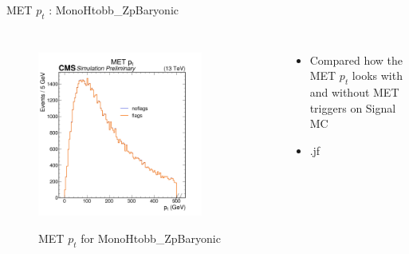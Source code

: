 \documentclass[10pt,xcolor=dvipsnames,aspectratio=169]{beamer}
\begin{document}
  \begin{frame}[fragile]{MET $p_t$ : MonoHtobb\_ZpBaryonic} 
    \begin{columns}
    \begin{figure} 
    \centering 
     \includegraphics[width=0.8\textwidth]{../Archive/KinemPlots/MCptMETflags.png }
    \label{METMCflagpt} 
    \caption{MET $p_t$ for MonoHtobb\_ZpBaryonic}
    \end{figure} 
    \begin{itemize} 
    \raggedright 
    \small
    \item Compared how the MET $p_t$ looks with and without MET triggers on Signal MC
    \item .jf
    \end{itemize}
    \end{columns} 
    \end{frame}
\end{document}
